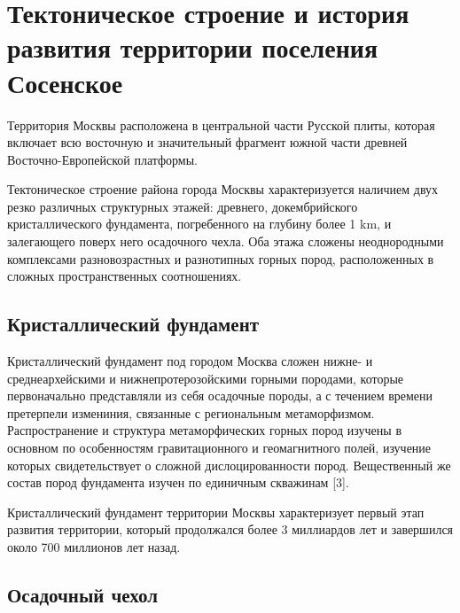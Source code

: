 \section{Тектоническое строение и история развития территории поселения Сосенское}\label{sec:ch2/sec2}

Территория Москвы расположена  в центральной части
Русской плиты, которая включает всю восточную и значительный фрагмент южной части древней
Восточно-Европейской платформы. 

Тектоническое строение района города Москвы характеризуется наличием двух резко различных
структурных этажей: древнего, докембрийского кристаллического фундамента, погребенного 
на глубину более 1 \si{\kilo\meter}, и залегающего поверх него осадочного чехла.
Оба этажа сложены неоднородными комплексами разновозрастных и разнотипных горных пород, 
расположенных в сложных пространственных соотношениях.

\subsection{Кристаллический фундамент}

Кристаллический фундамент под городом Москва сложен нижне- и среднеархейскими и 
нижнепротерозойскими горными породами, которые первоначально представляли из себя 
осадочные породы, а с течением времени претерпели измениния, связанные с региональным 
метаморфизмом. Распространение и структура метаморфических горных пород изучены в 
основном по особенностям гравитационного и геомагнитного полей, изучение которых свидетельствует 
о сложной дислоцированности пород. Вещественный же состав пород фундамента изучен по 
единичным скважинам [3]. 

Кристаллический фундамент территории Москвы характеризует первый этап развития территории,
который продолжался более 3 миллиардов лет и завершился около 700 миллионов лет назад.

\subsection{Осадочный чехол}

